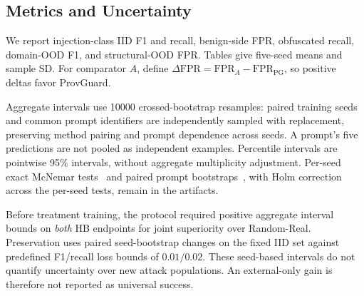 \documentclass[conference]{IEEEtran}
\newcommand{\BootstrapN}{10000}
\begin{document}
\subsection{Metrics and Uncertainty}
We report injection-class IID F1 and recall, benign-side FPR, obfuscated recall, domain-OOD F1, and structural-OOD FPR. Tables give five-seed means and sample SD. For comparator $A$, define $\Delta\mathrm{FPR}=\mathrm{FPR}_A-\mathrm{FPR}_{\mathrm{PG}}$, so positive deltas favor ProvGuard.

Aggregate intervals use \BootstrapN{} crossed-bootstrap resamples: paired training seeds and common prompt identifiers are independently sampled with replacement, preserving method pairing and prompt dependence across seeds. A prompt's five predictions are not pooled as independent examples. Percentile intervals are pointwise 95\% intervals, without aggregate multiplicity adjustment. Per-seed exact McNemar tests~\cite{mcnemar} and paired prompt bootstraps~\cite{efron}, with Holm correction across the per-seed tests, remain in the artifacts.

Before treatment training, the protocol required positive aggregate interval bounds on \emph{both} HB endpoints for joint superiority over Random-Real. Preservation uses paired seed-bootstrap changes on the fixed IID set against predefined F1/recall loss bounds of $0.01/0.02$. These seed-based intervals do not quantify uncertainty over new attack populations. An external-only gain is therefore not reported as universal success.
\end{document}
